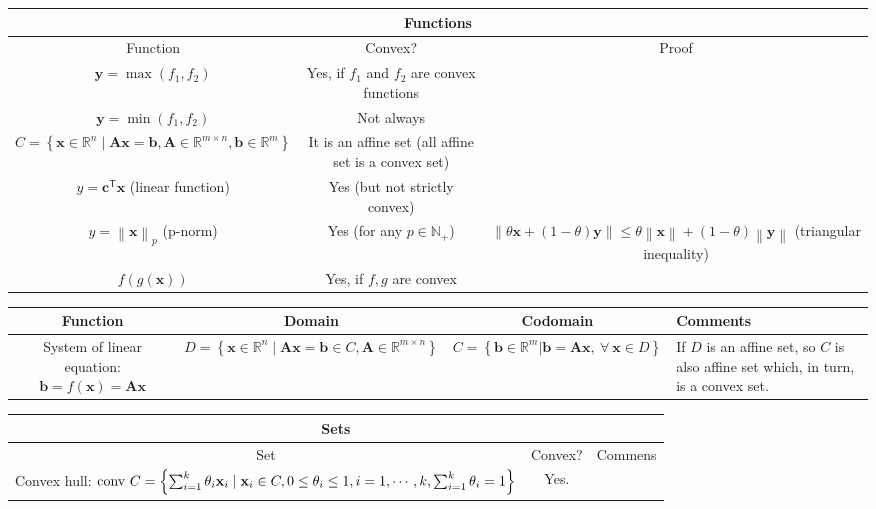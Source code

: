 \documentclass{article}
\newcommand{\trans}{\mathsf{T}}
\newcommand\norm[1]{\left\lVert#1\right\rVert}
\begin{document}
\begin{landscape}
    \vspace{-10ex}
    \begin{table}
        \centering
    \begin{tabular}{||c | c | c||}
        \hline
        \multicolumn{3}{|c|}{Functions} \\
        \hline
        Function & Convex? & Proof \\ [0.5ex] 
        \hline\hline
        $\mathbf{y} = \max(f_1, f_2)$ & Yes, if $f_1$ and $f_2$ are convex functions & \\
        \hline
        $\mathbf{y} = \min(f_1, f_2)$ & Not always & \\
        \hline
        $C = \left\{ \mathbf{x} \in \mathbb{R}^{n} \mid \mathbf{Ax} = \mathbf{b}, \mathbf{A} \in \mathbb{R}^{m \times n}, \mathbf{b} \in \mathbb{R}^{m} \right\}$ & It is an affine set (all affine set is a convex set)  & \\
        \hline
        $y = \mathbf{c}^\trans \mathbf{x}$ (linear function) & Yes (but not strictly convex) & \\
        \hline
        $y = \norm{\mathbf{x}}_p $ (p-norm) & Yes (for any $p \in \mathbb{N}_+$) & $\norm{\theta\mathbf{x} + (1-\theta)\mathbf{y}} \leq \theta\norm{\mathbf{x}} + (1-\theta)\norm{\mathbf{y}}$ (triangular inequality) \\
        \hline
        $f(g(\mathbf{x}))$ & Yes, if $f, g$ are convex & \\
        \hline
    \end{tabular}
    \begin{tabular}{|c|c|c|p{5cm}|}
        Function & Domain & Codomain & Comments \\
        \hline
        System of linear equation: $\mathbf{b} = f(\mathbf{x}) = \mathbf{Ax}$ & $D = \left\{ \mathbf{x} \in \mathbb{R}^{n} \mid \mathbf{Ax} = \mathbf{b} \in C, \mathbf{A} \in \mathbb{R}^{m \times n} \right\}$ & $C = \left\{ \mathbf{b} \in \mathbb{R}^{m} | \mathbf{b} = \mathbf{Ax},\: \forall\: \mathbf{x} \in D  \right\}$ & If $D$ is an affine set, so $C$ is also affine set which, in turn, is a convex set. \\ \hline
    \end{tabular}
    \begin{tabular}{|c|c|p{7cm}|}
        \hline
        \multicolumn{3}{|c|}{Sets}\\
        \hline
        Set & Convex? & Commens\\
        \hline
        \makecell{Convex hull: \\ $\textnormal{conv } C = \left\{ \sum_{i=1}^{k} \theta_i\mathbf{x}_i \mid \mathbf{x}_i \in C, 0 \le \theta_i \le 1, i=1,\cdots, k, \sum_{i=1}^{k} \theta_i = 1  \right\}$} & Yes. & \begin{itemize}[leftmargin=*]

\end{itemize}
\end{tabular}
\end{table}
\end{landscape}
\end{document}
